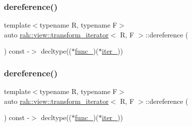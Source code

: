 \subsubsection{\texorpdfstring{dereference()}{dereference()}\hspace{0.1cm}{\footnotesize\ttfamily [1/2]}}
{\footnotesize\ttfamily template$<$typename R, typename F$>$ \\
auto \mbox{\hyperlink{structrah_1_1view_1_1transform__iterator}{rah\+::view\+::transform\+\_\+iterator}}$<$ R, F $>$\+::dereference (\begin{DoxyParamCaption}{ }\end{DoxyParamCaption}) const -\/$>$ decltype(($\ast$\mbox{\hyperlink{structrah_1_1view_1_1transform__iterator_aaac20c3aa93a6ac347e8c26d8c892ea9}{func\+\_\+}})($\ast$\mbox{\hyperlink{structrah_1_1view_1_1transform__iterator_a349798fe3a741068fd28e50387f39e80}{iter\+\_\+}})) \hspace{0.3cm}{\ttfamily [inline]}}

\mbox{\label{structrah_1_1view_1_1transform__iterator_a8059ce2756def1dcd7c91d5349d2661a}} 
\subsubsection{\texorpdfstring{dereference()}{dereference()}\hspace{0.1cm}{\footnotesize\ttfamily [2/2]}}
{\footnotesize\ttfamily template$<$typename R, typename F$>$ \\
auto \mbox{\hyperlink{structrah_1_1view_1_1transform__iterator}{rah\+::view\+::transform\+\_\+iterator}}$<$ R, F $>$\+::dereference (\begin{DoxyParamCaption}{ }\end{DoxyParamCaption}) const -\/$>$ decltype(($\ast$\mbox{\hyperlink{structrah_1_1view_1_1transform__iterator_aaac20c3aa93a6ac347e8c26d8c892ea9}{func\+\_\+}})($\ast$\mbox{\hyperlink{structrah_1_1view_1_1transform__iterator_a349798fe3a741068fd28e50387f39e80}{iter\+\_\+}})) \hspace{0.3cm}{\ttfamily [inline]}}

\mbox{\label{structrah_1_1view_1_1transform__iterator_ae0919c95985ebca42017346da790c981}} 

